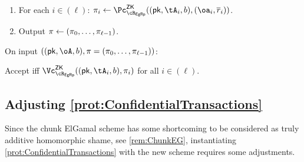 \begin{description}
\begin{description}
	\begin{enumerate}
		\item For each $i\in (\ell)$: $\pi_i \asn \pZK{\rEgRp}((\pk,\tA_i,b), (\oa_i,\orr_i))$.
		\item Output $\pi \leftarrow (\pi_0,\ldots, \pi_{\ell-1})$.
	\end{enumerate}
	 
	 
	 	\item[\Vc:] On  input  $((\pk,\oA,b), \pi= (\pi_0,\ldots, \pi_{\ell-1}))$:
	 
	 Accept iff  $\vZK{\rEgRp}((\pk,\tA_i,b), \pi_i)$ for all $i\in (\ell)$.
	 
	 
\end{description}


\end{description}


\subsection{Adjusting  \cref{prot:ConfidentialTransactions}}\label{sec:ChanksEG:Adjusting}
Since the chunk ElGamal  scheme has some shortcoming to be considered as truly additive  homomorphic shame, see \cref{rem:ChunkEG}, instantiating \cref{prot:ConfidentialTransactions} with the new scheme  requires some adjustments.


